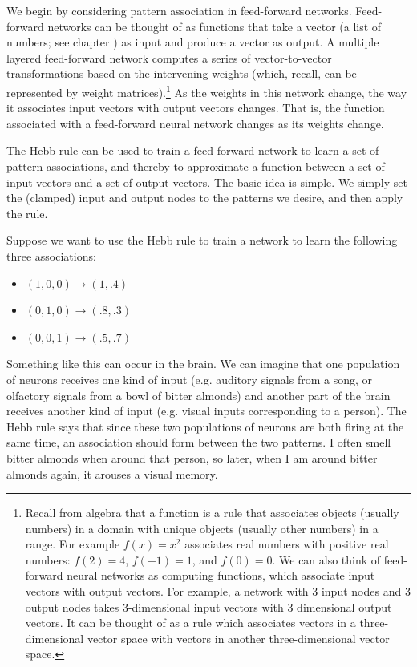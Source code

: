 
We begin by considering pattern association in feed-forward networks. Feed-forward networks can be thought of as functions that take a vector (a list of numbers; see chapter ) as input and produce a vector as output. A multiple layered feed-forward network computes a series of vector-to-vector transformations based on the intervening weights (which, recall, can be represented by weight matrices).\footnote{Recall from algebra that a function is a rule that associates objects (usually numbers) in a domain with unique objects (usually other numbers) in a range. For example $f(x) = x^2$ associates real numbers with positive real  numbers: $f(2) = 4$, $f(-1) = 1$, and $f(0) = 0$. We can also think of feed-forward neural networks as  computing functions, which associate input vectors with output vectors. For example, a network with 3 input nodes and 3 output nodes takes 3-dimensional input vectors with 3 dimensional output vectors. It can be thought of as a rule which associates vectors in a three-dimensional vector space with vectors in another three-dimensional vector space.} As the weights in this network change, the way it associates input vectors with output vectors changes. That is, the function associated with a feed-forward neural network changes as its weights change. 

The Hebb rule can be used to train a feed-forward network to learn a set of pattern associations, and thereby to approximate a function between a set of input vectors and a set of output vectors. The basic idea is simple. We simply set the (clamped) input and output nodes to the patterns we desire, and then apply the rule. 

Suppose we want to use the Hebb rule to train a network to learn the following three associations:
\begin{itemize}
\item $(1,0,0) \rightarrow (1,.4)$
\item $(0,1,0) \rightarrow (.8,.3)$
\item $(0,0,1) \rightarrow (.5,.7)$
\end{itemize}

Something like this can occur in the brain. We can imagine that one population of neurons receives one kind of input (e.g. auditory signals from a song, or olfactory signals from a bowl of bitter almonds) and another part of the brain receives another kind of input (e.g. visual inputs corresponding to a person). The Hebb rule says that since these two populations of neurons are both firing at the same time, an association should form between the two patterns. I often smell bitter almonds when around that person, so later, when I am around bitter almonds again, it arouses a visual memory.

